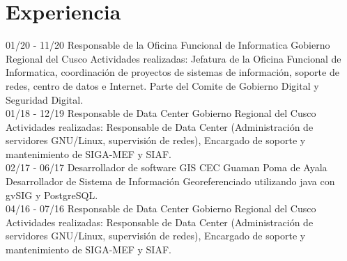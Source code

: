 \documentclass[]{friggeri-cv}
\begin{document}
\section{Experiencia}
\begin{entrylist}
    \entry
    {01/20 - 11/20}
    {Responsable de la Oficina Funcional de Informatica}
    {Gobierno Regional del Cusco}
    {Actividades realizadas: Jefatura de la Oficina Funcional de Informatica, coordinación de proyectos de sistemas de información,
     soporte de redes, centro de datos e Internet. Parte del Comite de Gobierno Digital y Seguridad Digital.\\}
    \entry
    {01/18 - 12/19}
    {Responsable de Data Center}
    {Gobierno Regional del Cusco}
    {Actividades realizadas: Responsable de Data Center (Administraci\'on de servidores GNU/Linux, supervisi\'on
    de redes), Encargado de soporte y mantenimiento de SIGA-MEF y SIAF.\\}
    \entry
    {02/17 - 06/17}
    {Desarrollador de software GIS}
    {CEC Guaman Poma de Ayala}
    {Desarrollador de Sistema de Informaci\'on Georeferenciado utilizando java con gvSIG y PostgreSQL.\\}
    \entry
    {04/16 - 07/16}
    {Responsable de Data Center}
    {Gobierno Regional del Cusco}
    {Actividades realizadas: Responsable de Data Center (Administraci\'on de servidores GNU/Linux, supervisi\'on
    de redes), Encargado de soporte y mantenimiento de SIGA-MEF y SIAF.\\}
\end{entrylist}
\end{document}
